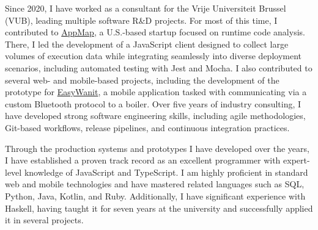 \documentclass[a4paper,11pt,english]{article}
\newcommand{\ImplicitLink}[2]{\href{#1}{\textcolor{MarkerColour!80!black}{#2}}}
\begin{document}
\vspace{12pt}

Since 2020, I have worked as a consultant for the Vrije Universiteit Brussel (VUB), leading multiple software R\&D projects. For most of this time, I contributed to \ImplicitLink{https://appmap.io}{AppMap}, a U.S.-based startup focused on runtime code analysis. There, I led the development of a JavaScript client designed to collect large volumes of execution data while integrating seamlessly into diverse deployment scenarios, including automated testing with Jest and Mocha. I also contributed to several web- and mobile-based projects, including the development of the prototype for \ImplicitLink{https://www.wanit.com/easywanit}{EasyWanit}, a mobile application tasked with communicating via a custom Bluetooth protocol to a boiler. Over five years of industry consulting, I have developed strong software engineering skills, including agile methodologies, Git-based workflows, release pipelines, and continuous integration practices.

\vspace{12pt}

Through the production systems and prototypes I have developed over the years, I have established a proven track record as an excellent programmer with expert-level knowledge of JavaScript and TypeScript. I am highly proficient in standard web and mobile technologies and have mastered related languages such as SQL, Python, Java, Kotlin, and Ruby. Additionally, I have significant experience with Haskell, having taught it for seven years at the university and successfully applied it in several projects.
\end{document}
